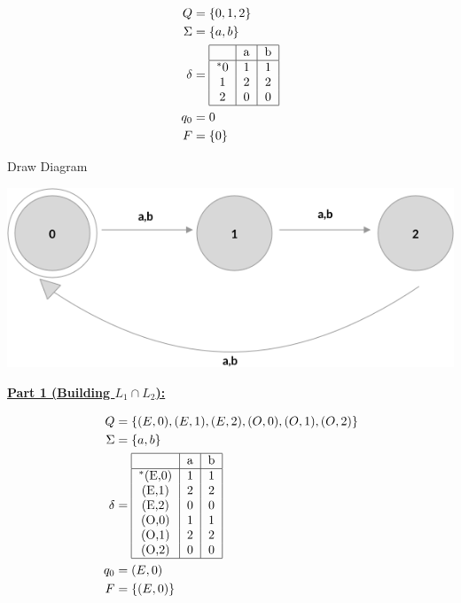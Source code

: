 \documentclass[12pt]{article}
\begin{document}
\begin{itemize}
    \begin{align*}
        Q &= \{0,1,2\}\\
        \Sigma &= \{a,b\}\\
        \delta &= \begin{tabular}{|c|c|c|}
        \hline
              & a & b\\
        \hline
        $^*$0 & 1 & 1\\
        1     & 2 & 2\\
        2     & 0 & 0\\
        \hline
        \end{tabular}\\
        q_0 &= 0\\
        F &= \{0\}
    \end{align*}

    \bigskip

    Draw Diagram

    \begin{center}
    \includegraphics[width=0.7 \linewidth]{images/worksheet_8_solution_2.png}
    \end{center}

    \bigskip

    \underline{\textbf{Part 1 (Building $L_1 \cap L_2$):}}

    \bigskip

    \begin{align*}
        Q &= \{(E,0),(E,1),(E,2),(O,0),(O,1),(O,2)\}\\
        \Sigma &= \{a,b\}\\
        \delta &= \begin{tabular}{|c|c|c|}
        \hline
            & a & b\\
        \hline
        $^*$(E,0) & 1 & 1\\
        (E,1)     & 2 & 2\\
        (E,2)     & 0 & 0\\
        (O,0)     & 1 & 1\\
        (O,1)     & 2 & 2\\
        (O,2)     & 0 & 0\\
        \hline
        \end{tabular}\\
        q_0 &= (E,0)\\
        F &= \{(E,0)\}
    \end{align*}


\end{itemize}
\end{document}
